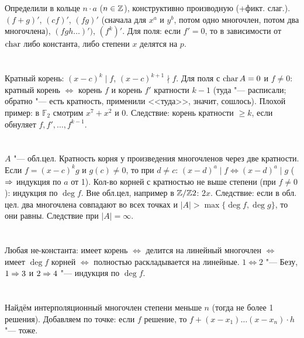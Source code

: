\section{} %
Определили в кольце $n \cdot a$ ($n \in \mathbb{Z}$), конструктивно производную (+фикт. слаг.). $(f+g)'$, $(cf)'$, $(fg)'$ (сначала для $x^a$ и $y^b$, потом одно многочлен, потом два многочлена), $(fgh\dots)')$, $(f^k)'$.
Для поля: если $f'=0$, то в зависимости от $\operatorname{char}$ либо константа, либо степени $x$ делятся на $p$.

\section{} %
Кратный корень: $(x-c)^k\mid f$, $(x-c)^{k+1}\nmid f$. Для поля с $\operatorname{char} A=0$ и $f\neq 0$: кратный корень $\iff$ корень $f$ и корень $f'$ кратности $k-1$
(туда "--- расписали; обратно "--- есть кратность, применили <<туда>>, значит, сошлось). Плохой пример: в $\mathbb{F}_2$ смотрим $x^7+x^2$ и 0.
Следствие: корень кратности $\ge k$, если обнуляет $f, f', \dots, f^{k-1}$.

\section{} %
$A$ "--- обл.цел. Кратность корня у произведения многочленов через две кратности. Если $f=(x-c)^kg$ и $g(c)\neq 0$, то при $d\neq c$: $(x-d)^a\mid f \iff (x-d)^a\mid g$ ($\Rightarrow$ индукция по $a$ от 1).
Кол-во корней с кратностью не выше степени (при $f\neq 0$): индукция по $\deg f$. Вне обл.цел, например в $\mathbb{Z}/\mathbb{Z}2$: $2x$. Следствие: если в обл. цел. два многочлена
совпадают во всех точках и $|A|>\max\{\deg f, \deg g\}$, то они равны. Следствие при $|A|=\infty$.

\section{} %
Любая не-константа: имеет корень $\iff$ делится на линейный многочлен $\iff$ имеет $\deg f$ корней $\iff$ полностью раскладывается на линейные. $1 \iff 2$ "--- Безу,
$1 \Rightarrow 3$ и $2 \Rightarrow 4$ "--- индукция по $\deg f$.

\section{} %
Найдём интерполяционный многочлен степени меньше $n$ (тогда не более 1 решения). Добавляем по точке: если $f$ решение, то $f+(x-x_1)\dots(x-x_n)\cdot h$ "--- тоже.

